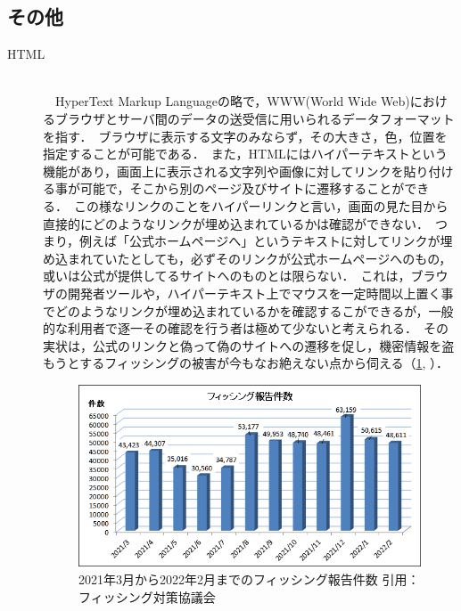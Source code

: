 \documentclass[dvipdfmx]{jsarticle}
\begin{document}
        \subsection{その他}
            \begin{description}
                \item[HTML]\mbox{}\\
                    　HyperText Markup Languageの略で，WWW(World Wide Web)におけるブラウザとサーバ間のデータの送受信に用いられるデータフォーマットを指す．\
                    ブラウザに表示する文字のみならず，その大きさ，色，位置を指定することが可能である．\
                    また，HTMLにはハイパーテキストという機能があり，画面上に表示される文字列や画像に対してリンクを貼り付ける事が可能で，そこから別のページ及びサイトに遷移することができる\cite{AboutHTML}．\
                    この様なリンクのことをハイパーリンクと言い，画面の見た目から直接的にどのようなリンクが埋め込まれているかは確認ができない．\
                    つまり，例えば「公式ホームページへ」というテキストに対してリンクが埋め込まれていたとしても，必ずそのリンクが公式ホームページへのもの，或いは公式が提供してるサイトへのものとは限らない．\
                    これは，ブラウザの開発者ツールや，ハイパーテキスト上でマウスを一定時間以上置く事でどのようなリンクが埋め込まれているかを確認するこができるが，一般的な利用者で逐一その確認を行う者は極めて少ないと考えられる．\
                    その実状は，公式のリンクと偽って偽のサイトへの遷移を促し，機密情報を盗もうとするフィッシングの被害が今もなお絶えない点から伺える（\ref{fishing}, \cite{Fishing}）．\
                    \begin{figure}[h]
                        \centering
                        \includegraphics[width=15cm]{img/fishing.png}
                        \caption{2021年3月から2022年2月までのフィッシング報告件数 引用：フィッシング対策協議会}
                        \label{fishing}
                    \end{figure}
            \end{description}
            \clearpage
\end{document}
